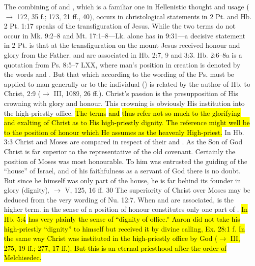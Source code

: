 \begin{compactdesc}
\begin{compactdesc}
							\item[8:175] The combining of  and , which is a familiar one in Hellenistic thought and usage ($\rightarrow$ 172, 35 f.; 173, 21 ff., 40), occurs in christological statements in 2 Pt. and Hb. 2 Pt. 1:17 speaks of the transfiguration of Jesus. While the two terms do not occur in Mk. 9:2--8 and Mt. 17:1--8---Lk. alone has  in 9:31---a decisive statement in 2 Pt. is that at the transfiguration on the mount Jesus received honour and glory from the Father.  and  are associated in Hb. 2:7, 9 and 3:3. Hb. 2:6--8a is a quotation from Ps. 8:5--7 LXX, where man's position in creation is denoted by the words  and . But that which according to the wording of the Ps. must be applied to man generally or to the individual () is related by the author of Hb. to Christ, 2:9 ($\rightarrow$ III, 1089, 26 ff.). Christ's passion is the presupposition of His crowning with glory and honour. This crowning is obviously His institution into the high-priestly office. \hl{The terms}  \hl{and}  \hl{thus refer not so much to the glorifying and exalting of Christ as to His high-priestly dignity. The reference might well be to the position of honour which He assumes as the heavenly High-priest.} In Hb. 3:3 Christ and Moses are compared in respect of their  and . As the Son of God Christ is far superior to the representative of the old covenant. Certainly the position of Moses was most honourable. To him was entrusted the guiding of the ``house'' of Israel, and of his faithfulness as a servant of God there is no doubt. But since he himself was only part of the house, he is far behind its founder in glory (dignity), $\rightarrow$ V, 125, 16 ff. 30 The superiority of Christ over Moses may be deduced from the very wording of Nu. 12:7. When \gr{δόξα} and  are associated,  is the higher term.  in the sense of a position of honour constitutes only one part of . \hl{In Hb. 5:4}  \hl{has very plainly the sense of ``dignity of office.'' Aaron did not take his high-priestly ``dignity'' to himself but received it by divine calling, Ex. 28:1 f. In the same way Christ was instituted in the high-priestly office by God ($\rightarrow$ III, 275, 19 ff.; 277, 17 ff.). But this is an eternal priesthood after the order of Melchisedec.}
						\end{compactdesc}
						

\end{compactdesc}
